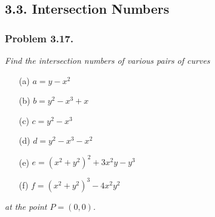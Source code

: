 \documentclass{article}
\begin{document}



\subsection*{3.3. Intersection Numbers \\}



\subsubsection*{Problem 3.17.}
\emph{Find the intersection numbers of various pairs of curves}
\begin{enumerate}
\item[(a)]
  $a = y - x^2$

\item[(b)]
  $b = y^2 - x^3 + x$

\item[(c)]
  $c = y^2 - x^3$

\item[(d)]
  $d = y^2 - x^3 - x^2$

\item[(e)]
  $e = (x^2+y^2)^2 + 3x^2 y - y^3$

\item[(f)]
  $f = (x^2+y^2)^3 - 4x^2 y^2$
\end{enumerate}
\emph{at the point $P = (0, 0)$.} \\
\end{document}
